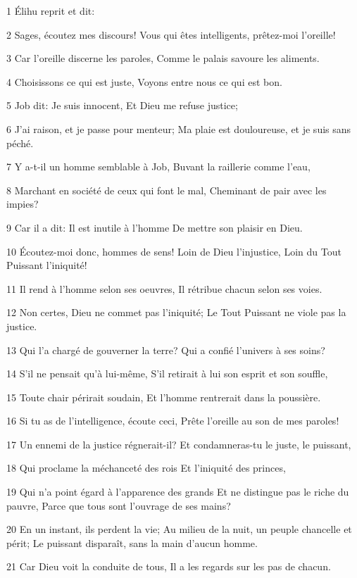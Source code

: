 \par 1 Élihu reprit et dit:
\par 2 Sages, écoutez mes discours! Vous qui êtes intelligents, prêtez-moi l'oreille!
\par 3 Car l'oreille discerne les paroles, Comme le palais savoure les aliments.
\par 4 Choisissons ce qui est juste, Voyons entre nous ce qui est bon.
\par 5 Job dit: Je suis innocent, Et Dieu me refuse justice;
\par 6 J'ai raison, et je passe pour menteur; Ma plaie est douloureuse, et je suis sans péché.
\par 7 Y a-t-il un homme semblable à Job, Buvant la raillerie comme l'eau,
\par 8 Marchant en société de ceux qui font le mal, Cheminant de pair avec les impies?
\par 9 Car il a dit: Il est inutile à l'homme De mettre son plaisir en Dieu.
\par 10 Écoutez-moi donc, hommes de sens! Loin de Dieu l'injustice, Loin du Tout Puissant l'iniquité!
\par 11 Il rend à l'homme selon ses oeuvres, Il rétribue chacun selon ses voies.
\par 12 Non certes, Dieu ne commet pas l'iniquité; Le Tout Puissant ne viole pas la justice.
\par 13 Qui l'a chargé de gouverner la terre? Qui a confié l'univers à ses soins?
\par 14 S'il ne pensait qu'à lui-même, S'il retirait à lui son esprit et son souffle,
\par 15 Toute chair périrait soudain, Et l'homme rentrerait dans la poussière.
\par 16 Si tu as de l'intelligence, écoute ceci, Prête l'oreille au son de mes paroles!
\par 17 Un ennemi de la justice régnerait-il? Et condamneras-tu le juste, le puissant,
\par 18 Qui proclame la méchanceté des rois Et l'iniquité des princes,
\par 19 Qui n'a point égard à l'apparence des grands Et ne distingue pas le riche du pauvre, Parce que tous sont l'ouvrage de ses mains?
\par 20 En un instant, ils perdent la vie; Au milieu de la nuit, un peuple chancelle et périt; Le puissant disparaît, sans la main d'aucun homme.
\par 21 Car Dieu voit la conduite de tous, Il a les regards sur les pas de chacun.
